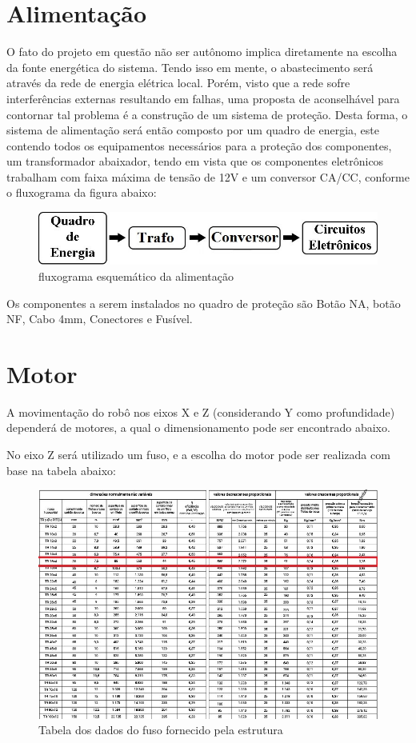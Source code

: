 \section[Alimentação]{Alimentação}

O fato do projeto em questão não ser autônomo implica diretamente na escolha da fonte energética do sistema. Tendo isso em mente, o abastecimento será através da rede de energia elétrica local.
Porém, visto que a rede sofre interferências externas resultando em falhas, uma proposta de aconselhável para contornar tal problema é a construção de um sistema de proteção.
Desta forma, o sistema de alimentação será então composto por um quadro de energia, este contendo todos os equipamentos necessários para a proteção dos componentes, um transformador abaixador, tendo em vista que os componentes eletrônicos trabalham com faixa máxima de tensão de 12V e um conversor CA/CC, conforme o fluxograma da figura abaixo: 

\begin{figure}[!h]
\centering
\includegraphics[scale=0.6, angle = 360]{figuras/fluxograma}
\caption[]{fluxograma esquemático da alimentação }
\end{figure}
\FloatBarrier

Os componentes a serem instalados no quadro de proteção são Botão NA, botão NF, Cabo 4mm, Conectores e Fusível.

\section{Motor}
A movimentação do robô nos eixos X e Z (considerando Y como profundidade) dependerá de motores, a qual o dimensionamento pode ser encontrado abaixo.

No eixo Z será utilizado um fuso, e a escolha do motor pode ser realizada com base na tabela abaixo:

\begin{figure}[!h]
\centering
\includegraphics[scale=0.8, angle = 360]{figuras/tabela_escolha_do_motor}
\caption[]{Tabela dos dados do fuso fornecido pela estrutura}
\end{figure}
\FloatBarrier

